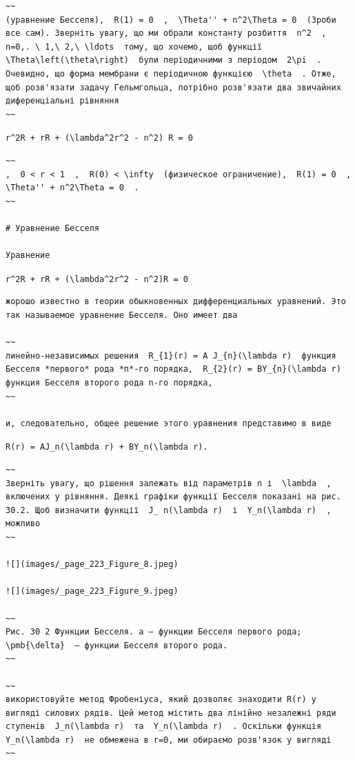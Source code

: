 \documentclass[
  ukrainian,
]{article}
\begin{document}
\begin{verbatim}
~~
(уравнение Бесселя),  R(1) = 0  ,  \Theta'' + n^2\Theta = 0  (Зроби все сам). Зверніть увагу, що ми обрали константу розбиття  n^2  ,  n=0,. \ 1,\ 2,\ \ldots  тому, що хочемо, щоб функції  \Theta\left(\theta\right)  були періодичними з періодом  2\pi  . Очевидно, що форма мембрани є періодичною функцією  \theta  . Отже, щоб розв'язати задачу Гельмгольца, потрібно розв'язати два звичайних диференціальні рівняння
~~
\end{verbatim}

\texttt{r\^{}2R\textquotesingle{}\textquotesingle{}\ +\ rR\textquotesingle{}\ +\ (\textbackslash{}lambda\^{}2r\^{}2\ -\ n\^{}2)\ R\ =\ 0}

\begin{verbatim}
~~
,  0 < r < 1  ,  R(0) < \infty  (физическое ограничение),  R(1) = 0  ,  \Theta'' + n^2\Theta = 0  .
~~

# Уравнение Бесселя

Уравнение
\end{verbatim}

\texttt{r\^{}2R\textquotesingle{}\textquotesingle{}\ +\ rR\textquotesingle{}\ +\ (\textbackslash{}lambda\^{}2r\^{}2\ -\ n\^{}2)R\ =\ 0}

\begin{verbatim}
жорошо известно в теории обыкновенных дифференциальных уравнений. Это так называемое уравнение Бесселя. Оно имеет два

~~
линейно-независимых решения  R_{1}(r) = A J_{n}(\lambda r)  функция Бесселя *первого* рода *п*-го порядка,  R_{2}(r) = BY_{n}(\lambda r)  функция Бесселя второго рода n-го порядка,
~~

и, следовательно, общее решение этого уравнения представимо в виде
\end{verbatim}

\texttt{R(r)\ =\ AJ\_n(\textbackslash{}lambda\ r)\ +\ BY\_n(\textbackslash{}lambda\ r).}

\begin{verbatim}
~~
Зверніть увагу, що рішення залежать від параметрів n і  \lambda  , включених у рівняння. Деякі графіки функції Бесселя показані на рис. 30.2. Щоб визначити функції  J_ n(\lambda r)  і  Y_n(\lambda r)  , можливо
~~

![](images/_page_223_Figure_8.jpeg)

![](images/_page_223_Figure_9.jpeg)

~~
Рис. 30 2 Функции Бесселя. a — функции Бесселя первого рода;  \pmb{\delta}  — функции Бесселя второго рода.
~~

~~
використовуйте метод Фробеніуса, який дозволяє знаходити R(r) у вигляді силових рядів. Цей метод містить два лінійно незалежні ряди ступенів  J_n(\lambda r)  та  Y_n(\lambda r)  . Оскільки функція  Y_n(\lambda r)  не обмежена в r=0, ми обираємо розв'язок у вигляді
~~
\end{verbatim}
\end{document}
